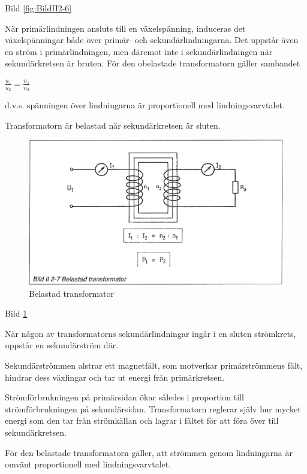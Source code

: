 Bild \ref{fig:BildII2-6}

När primärlindningen ansluts till en växelspänning, induceras det
växelspänningar både över primär- och sekundärlindningarna. Det uppstår även en
ström i primärlindningen, men däremot inte i sekundärlindningen när
sekundärkretsen är bruten. För den obelastade transformatorn gäller sambandet

\(\frac{u_1}{u_2} = \frac{n_1}{n_2}\)

d.v.s. spänningen över lindningarna är proportionell med lindningsvarvtalet.

Transformatorn är belastad när sekundärkretsen är sluten.

\begin{figure}[h]
\begin{center}
\includegraphics[width=14cm]{images/bild_2_2-07}
\caption{Belastad transformator}
\label{fig:BildII2-7}
\end{center}
\end{figure}

Bild \ref{fig:BildII2-7}

När någon av transformatorns sekundärlindningar ingår i en sluten strömkrets,
uppstår en sekundärström där.

Sekundärströmmen alstrar ett magnetfält, som motverkar primärströmmens fält,
hindrar dess växlingar och tar ut energi från primärkretsen.

Strömförbrukningen på primärsidan ökar således i proportion till
strömförbrukningen på sekundärsidan. Transformatorn reglerar själv hur mycket
energi som den tar från strömkällan och lagrar i fältet för att föra över
till sekundärkretsen.

För den belastade transformatorn gäller, att strömmen genom lindningarna är
omvänt proportionell med lindningsvarvtalet.

